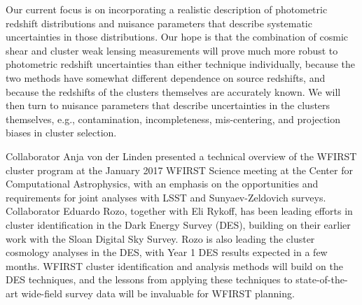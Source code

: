 Our current focus is on incorporating a realistic description of photometric
redshift distributions and nuisance parameters that describe systematic
uncertainties in those distributions. Our hope is that the combination of cosmic
shear and cluster weak lensing measurements will prove much more robust to
photometric redshift uncertainties than either technique individually, because
the two methods have somewhat different dependence on source redshifts, and
because the redshifts of the clusters themselves are accurately known. We will
then turn to nuisance parameters that describe uncertainties in the clusters
themselves, e.g., contamination, incompleteness, mis-centering, and projection
biases in cluster selection.

Collaborator Anja von der Linden presented a technical overview of the WFIRST
cluster program at the January 2017 WFIRST Science meeting at the Center for
Computational Astrophysics, with an emphasis on the opportunities and
requirements for joint analyses with LSST and Sunyaev-Zeldovich surveys.
Collaborator Eduardo Rozo, together with Eli Rykoff, has been leading efforts in
cluster identification in the Dark Energy Survey (DES), building on their
earlier work with the Sloan Digital Sky Survey.  Rozo is also leading the
cluster cosmology analyses in the DES, with Year 1 DES results expected in a few
months. WFIRST cluster identification and analysis methods will build on the DES
techniques, and the lessons from applying these techniques to state-of-the-art
wide-field survey data will be invaluable for WFIRST planning.
